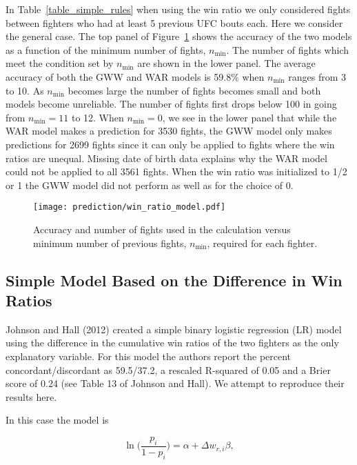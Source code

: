 In Table~\ref{table_simple_rules} when using the win ratio we only
considered fights between fighters who had at least 5 previous UFC bouts each.
Here we consider the general case.
The top panel of Figure~\ref{win_ratio_wins} shows the accuracy
of the two models as a
function of the minimum number of fights, $n_{\textrm{min}}$.
The number of fights which meet the condition
set by $n_{\textrm{min}}$ are shown in the
lower panel.
The average accuracy of both the GWW and WAR models is 59.8\% when
$n_{\textrm{min}}$ ranges from 3 to 10. As $n_{\textrm{min}}$ becomes
large the number of fights becomes small and both models
become unreliable. The number of fights first drops below 100 in
going from $n_{\textrm{min}}=11$ to 12. When $n_{\textrm{min}}=0$,
we see in the lower panel that while the WAR model makes
a prediction for 3530 fights, the GWW model only makes predictions for 2699 fights
since it can only be applied to fights where the win ratios are unequal.
Missing date of birth data explains why the WAR model could not be
applied to all 3561 fights. When the win ratio was initialized to 1/2
or 1 the GWW model did not perform as well as for the choice of 0.

\begin{figure}[h!]
\begin{center}
\texttt{[image: prediction/win\_ratio\_model.pdf]}
\caption{Accuracy and number of fights used in the calculation
versus minimum number of previous fights, $n_{\textrm{min}}$, required for each fighter.}
\label{win_ratio_wins}
\end{center}
\end{figure}

\clearpage
\subsection*{Simple Model Based on the Difference in Win Ratios}
Johnson and Hall (2012) created a simple binary logistic regression (LR) model using
the difference in the cumulative win ratios of the two fighters as the only explanatory variable.
For this model the authors report the percent concordant/discordant as 59.5/37.2, a
rescaled R-squared of 0.05 and a Brier score of 0.24 (see Table 13 of Johnson
and Hall).
We attempt to reproduce their results here.

In this case the model is

\begin{equation}
\ln\Bigg ( \frac{p_i}{1-p_i} \Bigg) = \alpha + \Delta w_{r,i} \beta,
\label{logit}
\end{equation}

